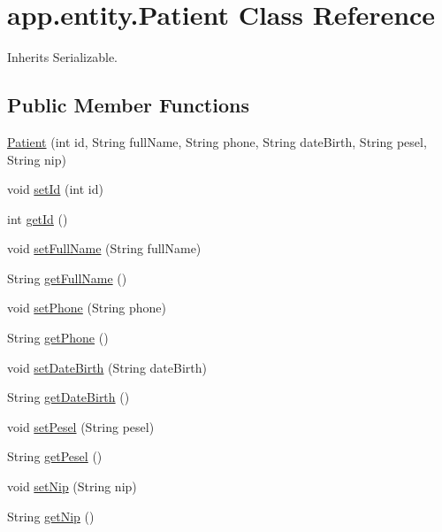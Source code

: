\hypertarget{classapp_1_1entity_1_1_patient}{}\section{app.\+entity.\+Patient Class Reference}
\label{classapp_1_1entity_1_1_patient}


Inherits Serializable.

\subsection*{Public Member Functions}
\begin{DoxyCompactItemize}
\item 
\mbox{\hyperlink{classapp_1_1entity_1_1_patient_a55fae198dfb53402a7edb681733b7e8e}{Patient}} (int id, String full\+Name, String phone, String date\+Birth, String pesel, String nip)
\item 
void \mbox{\hyperlink{classapp_1_1entity_1_1_patient_a7fa8873eaa6bd53e10606a11f0a68c1f}{set\+Id}} (int id)
\item 
int \mbox{\hyperlink{classapp_1_1entity_1_1_patient_ae83007344218065de629911933089412}{get\+Id}} ()
\item 
void \mbox{\hyperlink{classapp_1_1entity_1_1_patient_ae0e30fedfdb523f3cf2945b254ab004c}{set\+Full\+Name}} (String full\+Name)
\item 
String \mbox{\hyperlink{classapp_1_1entity_1_1_patient_aef4a029a9b1483e3fc88acb2784b3722}{get\+Full\+Name}} ()
\item 
void \mbox{\hyperlink{classapp_1_1entity_1_1_patient_a6ea42bebd9ee9d780ecc8abcb349641c}{set\+Phone}} (String phone)
\item 
String \mbox{\hyperlink{classapp_1_1entity_1_1_patient_a88fdb710e545deb3de9cb2c3e52982c0}{get\+Phone}} ()
\item 
void \mbox{\hyperlink{classapp_1_1entity_1_1_patient_a852ffd3a2112972d4da97027fbb4ad5a}{set\+Date\+Birth}} (String date\+Birth)
\item 
String \mbox{\hyperlink{classapp_1_1entity_1_1_patient_a39fd0ae8b57793227e232552fe905c65}{get\+Date\+Birth}} ()
\item 
void \mbox{\hyperlink{classapp_1_1entity_1_1_patient_aa9b9096f3ea49148b27a6fad04c1c11a}{set\+Pesel}} (String pesel)
\item 
String \mbox{\hyperlink{classapp_1_1entity_1_1_patient_ac9b8982afe39f13b4d468c6aed8af062}{get\+Pesel}} ()
\item 
void \mbox{\hyperlink{classapp_1_1entity_1_1_patient_a2e0fc43a5907b274184772864f34b06f}{set\+Nip}} (String nip)
\item 
String \mbox{\hyperlink{classapp_1_1entity_1_1_patient_af65c436f6dba6b83159818012bbef22e}{get\+Nip}} ()
\end{DoxyCompactItemize}


